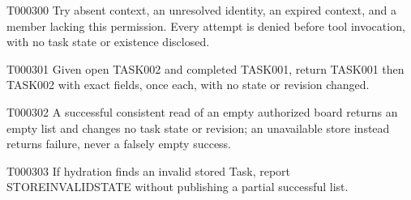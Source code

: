\documentclass[11pt,a4paper]{article}
\begin{document}
\par{}
\par{}\hypertarget{AC-TASK-LIST-AUTH}{}
\begin{atlasparagraph}{T000300}
Try absent context, an unresolved identity, an expired context, and a member lacking this permission. Every attempt is denied before tool invocation, with no task state or existence disclosed.
\end{atlasparagraph}
\par{}\hypertarget{AC-TASK-LIST-CONTENT}{}
\begin{atlasparagraph}{T000301}
Given open TASK002 and completed TASK001, return TASK001 then TASK002 with exact fields, once each, with no state or revision changed.
\end{atlasparagraph}
\par{}\hypertarget{AC-TASK-LIST-EMPTY}{}
\begin{atlasparagraph}{T000302}
A successful consistent read of an empty authorized board returns an empty list and changes no task state or revision; an unavailable store instead returns failure, never a falsely empty success.
\end{atlasparagraph}
\par{}\hypertarget{AC-TASK-LIST-INTEGRITY}{}
\begin{atlasparagraph}{T000303}
If hydration finds an invalid stored Task, report STORE\AtlasCharUnderscore{}INVALID\AtlasCharUnderscore{}STATE without publishing a partial successful list.
\end{atlasparagraph}
\end{document}
